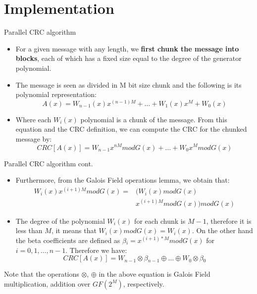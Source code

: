 \documentclass[10pt]{beamer}
\begin{document}
\section[Implementation]{Implementation}

\begin{frame}[fragile]{Parallel CRC algorithm}
\begin{itemize}
\item For a given message with any length, we \textbf{first chunk the 
message into blocks}, each of which has a fixed size equal to the degree of 
the generator polynomial. 

\item The message is seen as divided in M bit size chunk and the following 
is its polynomial representation:
\[
   A(x)=W_{n-1}(x)x^{(n-1)M}+\dots{}+W_{1}(x)x^{M}+W_{0}(x)
\]

\item Where each $W_{i}(x)$ polynomial is a chunk of the message. 
From this equation and the CRC definition, we can compute the CRC for the 
chunked message by:
\[
   CRC[A(x)]=W_{n-1}x^{nM}modG(x)+\dots{}+W_{0}x^{M}modG(x)
\]
\end{itemize}
\end{frame}

\begin{frame}[fragile]{Parallel CRC algorithm cont.}
\begin{itemize}
\item Furthermore, from the Galois Field operations lemma, we obtain that:
\[
\begin{split}
W_{i}(x)x^{(i+1)M}modG(x) = & (W_{i}(x)modG(x) \\& x^{(i+1)M}modG(x))modG(x)
\end{split}
\]

\item The degree of the polynomial $W_{i}(x)$ for each chunk is $M-1$, 
therefore it is less than $M$, it means that $W_{i}(x)modG(x)=W_{i}(x)$. 
On the other hand the beta coefficients are defined 
as $\beta{}_{i}=x^{(i+1)*M}modG(x)$ for $i=0,1,\dots{},n-1$. 
Therefore we have:
\[
   CRC[A(x)]=W_{n-1}\otimes{}\beta{}_{n-1}\oplus{}\dots{}
   \oplus{}W_{0}\otimes{}\beta{}_{0}
\]
\end{itemize}

Note that the operations $\otimes{}$, $\oplus{}$ in the above equation is 
Galois Field multiplication, addition over $GF(2^{M})$, respectively.
\end{frame}
\end{document}
